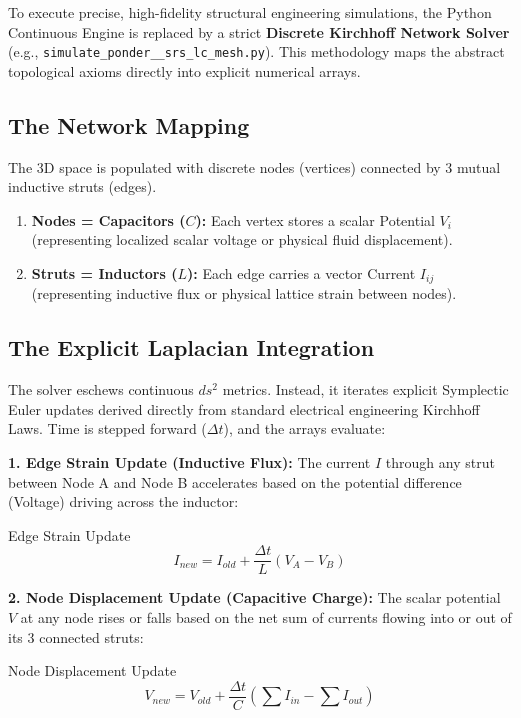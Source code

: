 To execute precise, high-fidelity structural engineering simulations, the Python Continuous Engine is replaced by a strict \textbf{Discrete Kirchhoff Network Solver} (e.g., \texttt{simulate\_\allowbreak ponder\_\_\allowbreak srs\_\allowbreak lc\_\allowbreak mesh.py}). This methodology maps the abstract topological axioms directly into explicit numerical arrays.

\subsection{The Network Mapping}
The 3D space is populated with discrete nodes (vertices) connected by 3 mutual inductive struts (edges).
\begin{enumerate}
    \item \textbf{Nodes = Capacitors ($C$):} Each vertex stores a scalar Potential $V_i$ (representing localized scalar voltage or physical fluid displacement).
    \item \textbf{Struts = Inductors ($L$):} Each edge carries a vector Current $I_{ij}$ (representing inductive flux or physical lattice strain between nodes).
\end{enumerate}

\subsection{The Explicit Laplacian Integration}
The solver eschews continuous $ds^2$ metrics. Instead, it iterates explicit Symplectic Euler updates derived directly from standard electrical engineering Kirchhoff Laws. Time is stepped forward ($\Delta t$), and the arrays evaluate:

\textbf{1. Edge Strain Update (Inductive Flux):}
The current $I$ through any strut between Node A and Node B accelerates based on the potential difference (Voltage) driving across the inductor:
\begin{resultbox}{Edge Strain Update}
\begin{equation}
    I_{new} = I_{old} + \frac{\Delta t}{L} \left( V_A - V_B \right)
\end{equation}
\end{resultbox}

\textbf{2. Node Displacement Update (Capacitive Charge):}
The scalar potential $V$ at any node rises or falls based on the net sum of currents flowing into or out of its 3 connected struts:
\begin{resultbox}{Node Displacement Update}
\begin{equation}
    V_{new} = V_{old} + \frac{\Delta t}{C} \left( \sum I_{in} - \sum I_{out} \right)
\end{equation}
\end{resultbox}

